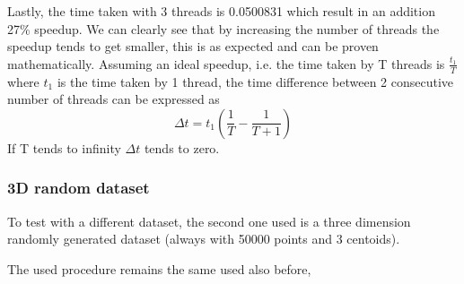 \documentclass{report}
\begin{document}
\begin{minipage}[b]{0.48\textwidth}
  Lastly, the time taken with 3 threads is 0.0500831 which result in an addition 27\% speedup. We can clearly see that by increasing the number of threads the speedup tends to get smaller, this is as expected and can be proven mathematically. Assuming an ideal speedup, i.e. the time taken by T threads is $\frac{t_1}{T}$ where $t_1$ is the time taken by 1 thread, the time difference between 2 consecutive number of threads can be expressed as
  \begin{equation*}
    \Delta t = t_1 ( \frac{1}{T} - \frac{1}{T + 1} )
  \end{equation*}
  If T tends to infinity $\Delta t$ tends to zero.

  \subsubsection*{3D random dataset}
  To test with a different dataset, the second one used is a three dimension randomly generated dataset (always with 50000 points and 3 centoids).

  The used procedure remains the same used also before,
\end{minipage}
\hspace{0.1in}
\end{document}
